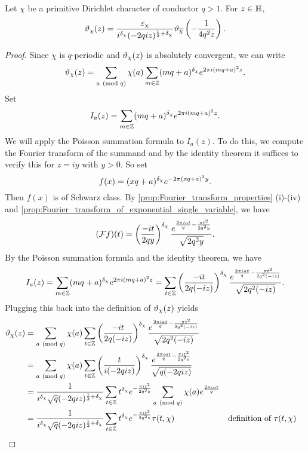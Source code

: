       \begin{theorem}\label{thm:functional_equation_Dirichlet_theta}
        Let $\chi$ be a primitive Dirichlet character of conductor $q > 1$. For $z \in \mathbb{H}$,
        \[
          \vartheta_{\chi}(z) = \frac{\varepsilon_{\chi}}{i^{\delta_{\chi}}(-2qiz)^{\frac{1}{2}+\delta_{\chi}}}\vartheta_{\overline{\chi}}\left(-\frac{1}{4q^{2}z}\right).
        \]
      \end{theorem}
      \begin{proof}
        Since $\chi$ is $q$-periodic and $\vartheta_{\chi}(z)$ is absolutely convergent, we can write
        \[
          \vartheta_{\chi}(z) = \sum_{a \ (\mathrm{mod}\text{ }q)}\chi(a)\sum_{m \in \mathbb{Z}}(mq+a)^{\delta_{\chi}}e^{2\pi i(mq+a)^{2}z}.
        \]
        Set
        \[
          I_{a}(z) = \sum_{m \in \mathbb{Z}}(mq+a)^{\delta_{\chi}}e^{2\pi i(mq+a)^{2}z}.
        \]
        We will apply the Poisson summation formula to $I_{a}(z)$. To do this, we compute the Fourier transform of the summand and by the identity theorem it suffices to verify this for $z = iy$ with $y > 0$. So set
        \[
          f(x) = (xq+a)^{\delta_{\chi}}e^{-2\pi(xq+a)^{2}y}.
        \]
        Then $f(x)$ is of Schwarz class. By \cref{prop:Fourier_transform_properties} (i)-(iv) and \cref{prop:Fourier_transform_of_exponential_single_variable}, we have
        \[
          (\mathcal{F}f)(t) = \left(\frac{-it}{2qy}\right)^{\delta_{\chi}}\frac{e^{\frac{2\pi iat}{q}-\frac{\pi t^{2}}{2q^{2}y}}}{\sqrt{2q^{2}y}}.
        \]
        By the Poisson summation formula and the identity theorem, we have
        \[
          I_{a}(z) = \sum_{m \in \mathbb{Z}}(mq+a)^{\delta_{\chi}}e^{2\pi i(mq+a)^{2}z} = \sum_{t \in \mathbb{Z}}\left(\frac{-it}{2q(-iz)}\right)^{\delta_{\chi}}\frac{e^{\frac{2\pi iat}{q}-\frac{\pi t^{2}}{2q^{2}(-iz)}}}{\sqrt{2q^{2}(-iz)}}.
        \]
        Plugging this back into the definition of $\vartheta_{\chi}(z)$ yields
        \begin{align*}
          \vt_{\chi}(z) &= \sum_{a \tmod{q}}\chi(a)\sum_{t \in \Z}\left(\frac{-it}{2q(-iz)}\right)^{\d_{\chi}}\frac{e^{\frac{2\pi iat}{q}-\frac{\pi t^{2}}{2q^{2}(-iz)}}}{\sqrt{2q^{2}(-iz)}} \\
          &= \sum_{a \tmod{q}}\chi(a)\sum_{t \in \Z}\left(\frac{t}{i(-2qiz)}\right)^{\d_{\chi}}\frac{e^{\frac{2\pi iat}{q}-\frac{\pi it^{2}}{2q^{2}z}}}{\sqrt{q(-2qiz)}} \\
          &= \frac{1}{i^{\d_{\chi}}\sqrt{q}(-2qiz)^{\frac{1}{2}+\d_{\chi}}}\sum_{t \in \Z}t^{\d_{\chi}}e^{-\frac{\pi it^{2}}{2q^{2}z}}\sum_{a \tmod{q}}\chi(a)e^{\frac{2\pi i at}{q}} \\
          &= \frac{1}{i^{\d_{\chi}}\sqrt{q}(-2qiz)^{\frac{1}{2}+\d_{\chi}}}\sum_{t \in \Z}t^{\d_{\chi}}e^{-\frac{\pi it^{2}}{2q^{2}z}}\tau(t,\chi) && \text{definition of $\tau(t,\chi)$} \\

\end{align*}
\end{proof}
